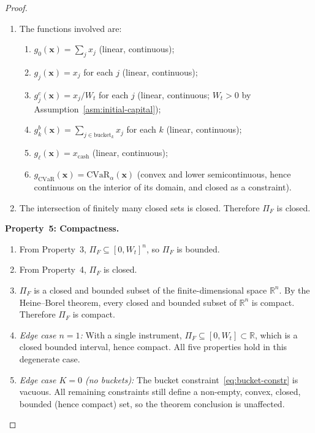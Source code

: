 \documentclass[12pt,openany]{book}
\newcommand{\bfx}{\mathbf{x}}
\numberwithin{equation}{chapter}
\theoremstyle{plain}
\theoremstyle{definition}
\theoremstyle{remark}
\numberwithin{equation}{chapter}
\theoremstyle{plain}
\begin{document}
\begin{proof}
\begin{enumerate}
  \item The functions involved are:
        \begin{enumerate}
          \item $g_0(\bfx) = \sum_j x_j$ (linear, continuous);
          \item $g_j(\bfx) = x_j$ for each $j$ (linear, continuous);
          \item $g_j^c(\bfx) = x_j / W_t$ for each $j$
                (linear, continuous; $W_t > 0$ by
                Assumption~\ref{asm:initial-capital});
          \item $g_k^b(\bfx) = \sum_{j \in \mathrm{bucket}_k} x_j$
                for each $k$ (linear, continuous);
          \item $g_{\ell}(\bfx) = x_{\mathrm{cash}}$
                (linear, continuous);
          \item $g_{\mathrm{CVaR}}(\bfx) =
                \mathrm{CVaR}_\alpha(\bfx)$ (convex and
                lower semicontinuous, hence continuous on the
                interior of its domain, and closed as a constraint).
        \end{enumerate}

  \item The intersection of finitely many closed sets is closed.
        Therefore $\Pi_F$ is closed.
\end{enumerate}

\medskip
\noindent\textbf{Property~5: Compactness.}

\begin{enumerate}
  \item From Property~3, $\Pi_F \subseteq [0, W_t]^n$, so $\Pi_F$
        is bounded.

  \item From Property~4, $\Pi_F$ is closed.

  \item $\Pi_F$ is a closed and bounded subset of the finite-dimensional
        space $\mathbb{R}^n$.  By the Heine--Borel theorem, every
        closed and bounded subset of $\mathbb{R}^n$ is compact.
        Therefore $\Pi_F$ is compact.

  \item \textit{Edge case $n = 1$:} With a single instrument,
        $\Pi_F \subseteq [0, W_t] \subset \mathbb{R}$, which is a
        closed bounded interval, hence compact.  All five properties
        hold in this degenerate case.

  \item \textit{Edge case $K = 0$ (no buckets):}
        The bucket constraint~\eqref{eq:bucket-constr} is vacuous.
        All remaining constraints still define a non-empty, convex,
        closed, bounded (hence compact) set, so the theorem
        conclusion is unaffected.
\end{enumerate}


\end{proof}
\end{document}
